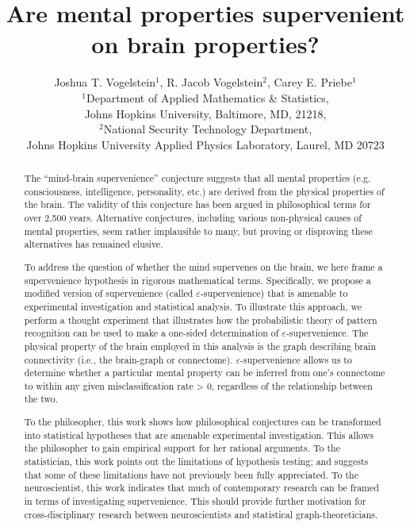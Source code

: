 \documentclass{article}
\title{Are mental properties supervenient on brain properties?}
\author{Joshua T. Vogelstein$^1$, R. Jacob Vogelstein$^2$, Carey E. Priebe$^1$\\
$^1$Department of Applied Mathematics \& Statistics, \\ Johns Hopkins University, Baltimore, MD, 21218,\\ $^2$National Security Technology Department, \\ Johns Hopkins University Applied Physics Laboratory, Laurel, MD 20723
}
\newcommand{\eps}{\varepsilon}
\begin{document}
\maketitle
\begin{abstract}
	
	The ``mind-brain supervenience'' conjecture suggests that all mental properties (e.g. consciousness, intelligence, personality, etc.) are derived from the physical properties of the brain. The validity of this conjecture has been argued in philosophical terms for over 2,500 years. Alternative conjectures, including various non-physical causes of mental properties, seem rather implausible to many, but proving or disproving these alternatives has remained elusive.

	To address the question of whether the mind supervenes on the brain, we here frame a supervenience hypothesis in rigorous mathematical terms.  Specifically, we propose a modified version of supervenience (called $\eps$-supervenience) that is amenable to experimental investigation and statistical analysis. To illustrate this approach, we perform a thought experiment that illustrates how the probabilistic theory of pattern recognition can be used to make a one-sided determination of $\eps$-supervenience. The physical property of the brain employed in this analysis is the graph describing brain connectivity (i.e., the brain-graph or connectome).  $\eps$-supervenience allows us to determine whether a particular mental property can be inferred from one's connectome to within any given misclassification rate > 0, regardless of the relationship between the two.

	To the philosopher, this work shows how philosophical conjectures can be transformed into statistical hypotheses that are amenable experimental investigation.  This allows the philosopher to gain empirical support for her rational arguments. To the statistician, this work points out the limitations of hypothesis testing; and suggests that some of these limitations have not previously been fully appreciated.  To the neuroscientist, this work indicates that much of contemporary research can be framed in terms of investigating supervenience. This should provide further motivation for cross-disciplinary research between neuroscientists and statistical graph-theoreticians.
	


\end{abstract}

\end{document}
